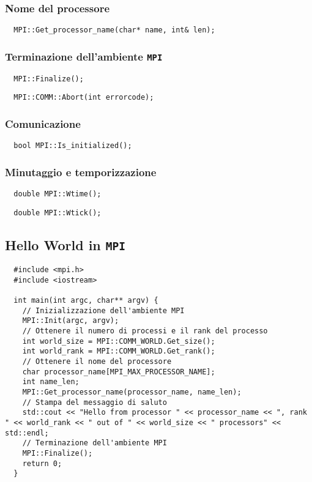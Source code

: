 \subsubsection{Nome del processore}
\begin{lstlisting}
  MPI::Get_processor_name(char* name, int& len);
\end{lstlisting}

\subsubsection{Terminazione dell'ambiente \texttt{MPI}}
\begin{lstlisting}
  MPI::Finalize();
\end{lstlisting}

\begin{lstlisting}
  MPI::COMM::Abort(int errorcode);
\end{lstlisting}

\subsubsection{Comunicazione}
\begin{lstlisting}
  bool MPI::Is_initialized();
\end{lstlisting}

\subsubsection{Minutaggio e temporizzazione}
\begin{lstlisting}
  double MPI::Wtime();
\end{lstlisting}

\begin{lstlisting}
  double MPI::Wtick();
\end{lstlisting}

\subsection{Hello World in \texttt{MPI}}
\begin{lstlisting}
  #include <mpi.h>
  #include <iostream>

  int main(int argc, char** argv) {
    // Inizializzazione dell'ambiente MPI
    MPI::Init(argc, argv);
    // Ottenere il numero di processi e il rank del processo
    int world_size = MPI::COMM_WORLD.Get_size();
    int world_rank = MPI::COMM_WORLD.Get_rank();
    // Ottenere il nome del processore
    char processor_name[MPI_MAX_PROCESSOR_NAME];
    int name_len;
    MPI::Get_processor_name(processor_name, name_len);
    // Stampa del messaggio di saluto
    std::cout << "Hello from processor " << processor_name << ", rank " << world_rank << " out of " << world_size << " processors" << std::endl;
    // Terminazione dell'ambiente MPI
    MPI::Finalize();
    return 0;
  }
\end{lstlisting}


